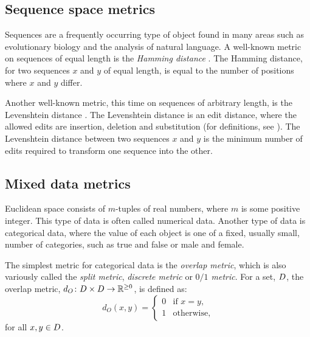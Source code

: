 \subsection{Sequence space metrics}
\label{sec:sequ-space-metr}

Sequences are a frequently occurring type of object found in many areas such
as evolutionary biology and the analysis of natural language.  A well-known
metric on sequences of equal length is the \textit{Hamming distance}
\citep{hamming50errorcodes}.  The Hamming distance, for two sequences $x$ and
$y$ of equal length, is equal to the number of positions where $x$ and $y$
differ.

Another well-known metric, this time on sequences of arbitrary length, is the
Levenshtein distance \cite{levenshtein1965distance}.  The Levenshtein distance
is an edit distance, where the allowed edits are insertion, deletion and
substitution (for definitions, see \cite{levenshtein1966distanceEN}).  The
Levenshtein distance between two sequences $x$ and $y$ is the minimum number
of edits required to transform one sequence into the other.

\subsection{Mixed data metrics}
\label{sec:mixed-data-metrics}

Euclidean space consists of $m$-tuples of real numbers, where $m$ is some
positive integer.  This type of data is often called numerical data.  Another
type of data is categorical data, where the value of each object is one of a
fixed, usually small, number of categories, such as true and false or male and
female.

The simplest metric for categorical data is the \textit{overlap metric}, which
is also variously called the \textit{split metric}, \textit{discrete metric}
or \textit{$0/1$ metric}.  For a set, $D$, the overlap metric, $d_{O}
\colon D \times D \to \mathbb{R}^{\geq 0}$, is defined as:
\begin{equation*}
  d_O(x,y) =
  \begin{cases}
    0 & \text{if $x=y$,} \\
    1 & \text{otherwise,}
  \end{cases}
\end{equation*}
for all $x,y \in D$.

